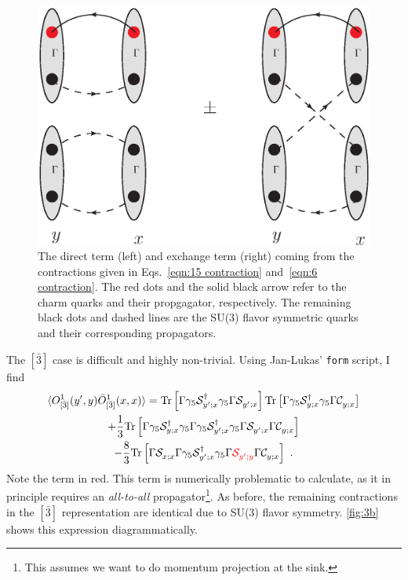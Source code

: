 \documentclass[11pt]{article}
\begin{document}
\begin{figure}
\center
\includegraphics[width=.5\columnwidth]{contract1.eps}
\caption{The direct term (left) and exchange term (right) coming from the contractions given in Eqs.~\eqref{eqn:15 contraction} and~\eqref{eqn:6 contraction}.  The red dots and the solid black arrow refer to the charm quarks and their propgagator, respectively.  The remaining black dots and dashed lines are the SU(3) flavor symmetric quarks and their corresponding propagators. \label{fig:15 and 6}}
\end{figure}
The $[\bar{3}]$ case is difficult and highly non-trivial.  Using Jan-Lukas' \texttt{form} script, I find
\begin{multline}\label{eqn:3b contraction}
\langle O^{1}_{[\bar{3}]}(y',y)\bar{O}^{1}_{[\bar{3}]}(x,x)\rangle =\text{Tr}\left[\Gamma \gamma_5\mathcal{S}^\dag_{y'; x}\gamma_5\Gamma\mathcal{S}^{}_{y';x}\right]
\text{Tr}\left[\Gamma \gamma_5\mathcal{S}^\dag_{y; x}\gamma_5\Gamma\mathcal{C}^{}_{y; x}\right]\\
+\frac{1}{3}\text{Tr}\left[\Gamma \gamma_5\mathcal{S}^\dag_{y; x}\gamma_5\Gamma\gamma_5\mathcal{S}^\dag_{y'; x}\gamma_5\Gamma \mathcal{S}^{}_{y'; x}\Gamma\mathcal{C}^{}_{y; x}\right]\\
-\frac{8}{3}\text{Tr}\left[\Gamma \mathcal{S}^{}_{x; x}\Gamma\gamma_5\mathcal{S}^\dag_{y'; x}\gamma_5\Gamma {\color{red}\mathcal{S}^{}_{y'; y}}\Gamma\mathcal{C}^{}_{y; x}\right]\ .
\end{multline}
Note the term in {\color{red}red}.  This term is numerically problematic to calculate, as it in principle requires an \emph{all-to-all} propagator\footnote{This assumes we want to do momentum projection at the sink.}.  As before, the remaining contractions in the $[\bar{3}]$ representation are identical due to SU(3) flavor symmetry. \autoref{fig:3b} shows this expression diagrammatically.
\end{document}
